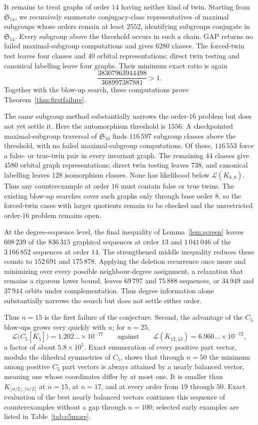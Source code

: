 \documentclass[11pt]{article}
\theoremstyle{definition}
\newcommand{\Lk}{\mathcal{L}}
\newcommand{\Kbal}{K_{\lfloor n/2\rfloor,\lceil n/2\rceil}}
\begin{document}
It remains to treat graphs of order $14$ having neither kind of twin.  Starting
from $\mathfrak S_{14}$, we recursively enumerate conjugacy-class
representatives of maximal subgroups whose orders remain at least $2552$,
identifying subgroups conjugate in $\mathfrak S_{14}$.  Every subgroup above
the threshold occurs in such a chain.  GAP returns no failed maximal-subgroup
computations and gives $6280$ classes.  The forced-twin test leaves four
classes and $40$ orbital representations; direct twin testing and canonical
labelling leave four graphs.  Their minimum exact ratio is again
\[
\frac{38307963944498}{368997387881}>1.
\]
Together with the blow-up search, these computations prove
Theorem~\ref{thm:firstfailure}.

The same subgroup method substantially narrows the order-$16$ problem but
does not yet settle it.  Here the automorphism threshold is $1556$.  A
checkpointed maximal-subgroup traversal of $\mathfrak S_{16}$ finds
$116\,597$ subgroup classes above the threshold, with no failed
maximal-subgroup computations.  Of these, $116\,553$ force a false- or
true-twin pair in every invariant graph.  The remaining $44$ classes give
$4580$ orbital graph representations; direct twin testing leaves $738$, and
canonical labelling leaves $128$ isomorphism classes.  None has likelihood
below $\Lk(K_{8,8})$.  Thus any counterexample at order $16$ must contain
false or true twins.  The existing blow-up searches cover such graphs only
through base order $8$, so the forced-twin cases with larger quotients remain
to be checked and the unrestricted order-$16$ problem remains open.

At the degree-sequence level, the final inequality of Lemma~\ref{lem:screen}
leaves $608\,239$ of the $836\,315$ graphical sequences at order $13$ and
$1\,041\,046$ of the $3\,166\,852$ sequences at order $14$.  The strengthened
middle inequality reduces these counts to $152\,691$ and $175\,878$.
Applying the deletion recurrence once more and minimizing over every possible
neighbour-degree assignment, a relaxation that remains a rigorous lower
bound, leaves $69\,797$ and $75\,888$ sequences, or $34\,949$ and $37\,944$
orbits under complementation.  Thus degree information alone substantially
narrows the search but does not settle either order.

Thus $n=15$ is the first failure of the conjecture. Second, the advantage of
the $C_5$ blow-ups grows very quickly with $n$; for $n=25$,
\[
\Lk\big(C_5[\overline{K_5}]\big)=1.202\ldots\times 10^{-77}
\qquad\text{against}\qquad
\Lk(K_{12,13})=6.960\ldots\times 10^{-72},
\]
a factor of about $5.8\times 10^{5}$.  Exact enumeration of every positive
part vector, modulo the dihedral symmetries of $C_5$, shows that through
$n=50$ the minimum among positive $C_5$ part vectors is always attained by a
nearly balanced vector, meaning one whose coordinates differ by at most one.
It is smaller than $\Kbal$ at $n=15$, at $n=17$, and at
every order from $19$ through $50$.  Exact evaluation of the best nearly
balanced vectors continues this sequence of counterexamples without a gap
through $n=100$; selected early examples are listed in
Table~\ref{tab:c5more}.
\end{document}
